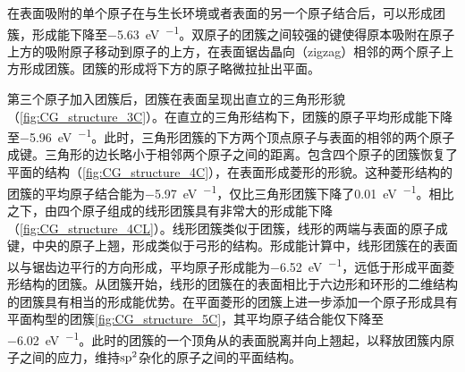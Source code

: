     在表面吸附的单个原子在与生长环境或者表面的另一个原子结合后，可以形成团簇，形成能下降至\SI{-5.63}{\electronvolt\per\atom}。双原子的团簇之间较强的键使得原本吸附在原子上方的吸附原子移动到原子的上方，在表面锯齿晶向（zigzag）相邻的两个原子上方形成团簇。团簇的形成将下方的原子略微拉扯出平面。


    第三个原子加入团簇后，团簇在表面呈现出直立的三角形形貌（\ref{fig:CG_structure_3C}）。在直立的三角形结构下，团簇的原子平均形成能下降至\SI{-5.96}{\electronvolt\per\atom}。此时，三角形团簇的下方两个顶点原子与表面的相邻的两个原子成键。三角形的边长略小于相邻两个原子之间的距离。包含四个原子的团簇恢复了平面的结构（\ref{fig:CG_structure_4C}），在表面形成菱形的形貌。这种菱形结构的团簇的平均原子结合能为\SI{-5.97}{\electronvolt\per\atom}，仅比三角形团簇下降了\SI{0.01}{\electronvolt\per\atom}。相比之下，由四个原子组成的线形团簇具有非常大的形成能下降（\ref{fig:CG_structure_4CL}）。线形团簇类似于团簇，线形的两端与表面的原子成键，中央的原子上翘，形成类似于弓形的结构。形成能计算中，线形团簇在的表面以与锯齿边平行的方向形成，平均原子形成能为\SI{-6.52}{\electronvolt\per\atom}，远低于形成平面菱形结构的团簇。从团簇开始，线形的团簇在的表面相比于六边形和环形的二维结构的团簇具有相当的形成能优势。在平面菱形的团簇上进一步添加一个原子形成具有平面构型的团簇\ref{fig:CG_structure_5C}，其平均原子结合能仅下降至\SI{-6.02}{\electronvolt\per\atom}。此时的团簇的一个顶角从的表面脱离并向上翘起，以释放团簇内原子之间的应力，维持$\rm sp^2$杂化的原子之间的平面结构。

